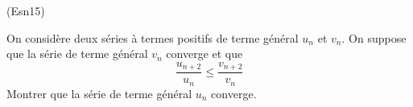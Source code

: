 \begin{tiny}(Esn15)\end{tiny} On considère deux séries à termes positifs de terme général $u_n$ et $v_n$. On suppose que la série de terme général $v_n$ converge et que
\begin{displaymath}
  \frac{u_{n+2}}{u_n} \leq \frac{v_{n+2}}{v_n}
\end{displaymath}
Montrer que la série de terme général $u_n$ converge.